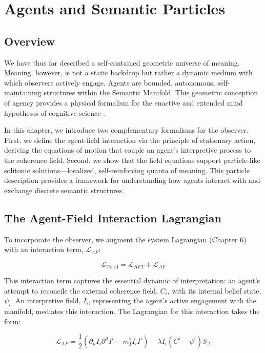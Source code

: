 \chapter{Agents and Semantic Particles}

\section{Overview}

We have thus far described a self-contained geometric universe of meaning. Meaning, however, is not a static backdrop but rather a dynamic medium with which observers actively engage. Agents are bounded, autonomous, self-maintaining structures within the Semantic Manifold. This geometric conception of agency provides a physical formalism for the enactive and extended mind hypotheses of cognitive science \autocite{VarelaThompsonRosch1991, ClarkChalmers1998}.

In this chapter, we introduce two complementary formalisms for the observer. First, we define the agent-field interaction via the principle of stationary action, deriving the equations of motion that couple an agent's interpretive process to the coherence field. Second, we show that the field equations support particle-like solitonic solutions—localized, self-reinforcing quanta of meaning. This particle description provides a framework for understanding how agents interact with and exchange discrete semantic structures.

\section{The Agent-Field Interaction Lagrangian}

To incorporate the observer, we augment the system Lagrangian (Chapter 6) with an interaction term, \(\mathcal{L}_{AF}\):

\begin{equation}
\mathcal{L}_{\text{Total}} = \mathcal{L}_{RFT} + \mathcal{L}_{AF}
\end{equation}

This interaction term captures the essential dynamic of interpretation: an agent's attempt to reconcile the external coherence field, \(C_i\), with its internal belief state, \(\psi_i\). An interpretive field, \(I_i\), representing the agent's active engagement with the manifold, mediates this interaction. The Lagrangian for this interaction takes the form:

\begin{equation}
\mathcal{L}_{AF} = \frac{1}{2} \left( \partial_\mu I_i \partial^\mu I^i - m_I^2 I_i I^i \right) - \lambda I_i (C^i - \psi^i) S_A
\end{equation}

